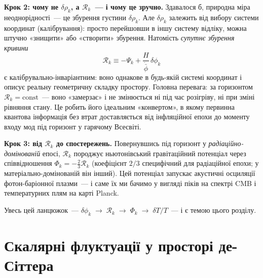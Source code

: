 \medskip
\noindent\textbf{Крок 2: чому не $\delta\rho_k$, а $\mathcal{R}_k$~--- і чому це зручно.}
Здавалося б, природна міра неоднорідності~--- це збурення
густини $\delta\rho_k$. Але $\delta\rho_k$ залежить від вибору
системи координат (калібрування): просто перейшовши в іншу
систему відліку, можна штучно «знищити» або «створити» збурення.
Натомість \emph{супутнє збурення кривини}
\begin{equation*}
  \mathcal{R}_k \equiv -\Psi_k + \frac{H}{\dot{\bar\phi}}\,\delta\phi_k
\end{equation*}
є калібрувально-інваріантним: воно однакове в будь-якій системі
координат і описує реальну геометричну складку простору.
Головна перевага: за горизонтом $\mathcal{R}_k = \mathrm{const}$~---
воно «замерзає» і не змінюється ні під час розігріву, ні при
зміні рівняння стану. Це робить його ідеальним «конвертом»,
в якому первинна квантова інформація без втрат доставляється
від інфляційної епохи до моменту входу мод під горизонт у
гарячому Всесвіті.

\medskip
\noindent\textbf{Крок 3: від $\mathcal{R}_k$ до спостережень.}
Повернувшись під горизонт у \emph{радіаційно-домінованій} епосі,
$\mathcal{R}_k$ породжує ньютонівський гравітаційний потенціал
через співвідношення $\Phi_k = -\frac{2}{3}\mathcal{R}_k$
(коефіцієнт $2/3$ специфічний для радіаційної епохи; у
матеріально-домінованій він інший). Цей потенціал запускає
акустичні осциляції фотон-баріонної плазми~--- і саме їх ми
бачимо у вигляді піків на спектрі CMB і температурних плям на
карті Planck.

\medskip
\noindent Увесь цей ланцюжок~---
$\delta\phi_k \;\to\; \mathcal{R}_k \;\to\; \Phi_k \;\to\;
\delta T/T$~--- і є темою цього розділу.


\section{Скалярні флуктуації у просторі де-Сіттера}

